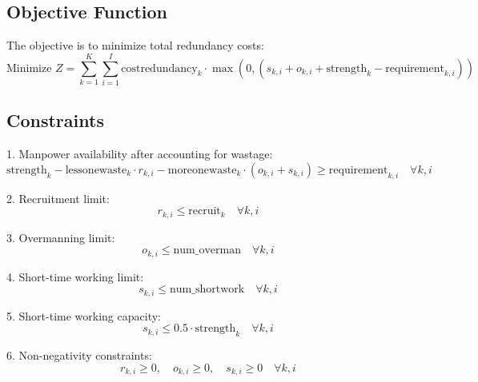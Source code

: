 \documentclass{article}
\begin{document}
\subsection*{Objective Function}
The objective is to minimize total redundancy costs:
\[
\text{Minimize } Z = \sum_{k=1}^{K} \sum_{i=1}^{I} \text{costredundancy}_{k} \cdot \max(0, (s_{k,i} + o_{k,i} + \text{strength}_{k} - \text{requirement}_{k,i})) 
\]

\subsection*{Constraints}
1. Manpower availability after accounting for wastage:
\[
\text{strength}_{k} - \text{lessonewaste}_{k} \cdot r_{k,i} - \text{moreonewaste}_{k} \cdot (o_{k,i} + s_{k,i}) \geq \text{requirement}_{k,i} \quad \forall k, i
\]

2. Recruitment limit:
\[
r_{k,i} \leq \text{recruit}_{k} \quad \forall k, i
\]

3. Overmanning limit:
\[
o_{k,i} \leq \text{num\_overman} \quad \forall k, i
\]

4. Short-time working limit:
\[
s_{k,i} \leq \text{num\_shortwork} \quad \forall k, i
\]

5. Short-time working capacity:
\[
s_{k,i} \leq 0.5 \cdot \text{strength}_{k} \quad \forall k, i
\]

6. Non-negativity constraints:
\[
r_{k,i} \geq 0, \quad o_{k,i} \geq 0, \quad s_{k,i} \geq 0 \quad \forall k, i
\]
\end{document}
